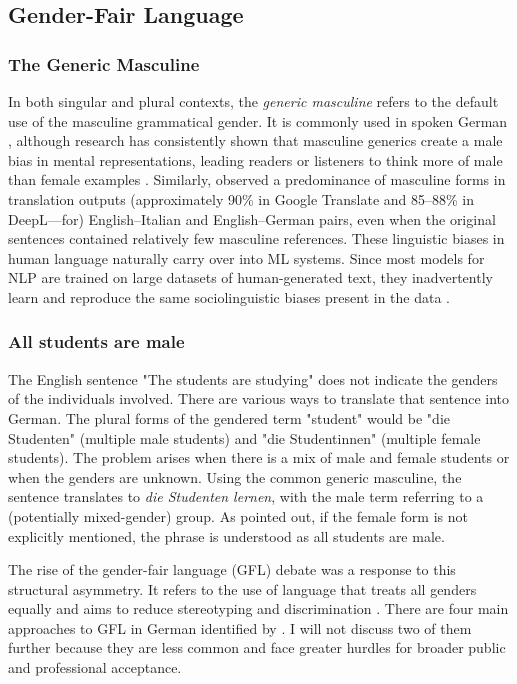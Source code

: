 \subsection{Gender-Fair Language}

\subsubsection{The Generic Masculine}  
In both singular and plural contexts, the \textit{generic masculine} refers to the default use of the masculine grammatical gender. It is commonly used in spoken German \citep{lardelliBuildingBridgesDataset2024,schmitzGermanAllProfessors2022}, although research has consistently shown that masculine generics create a male bias in mental representations, leading readers or listeners to think more of male than female examples \citep{sczesnyCanGenderFairLanguage2016}. Similarly, \citet{rescignoGenderBiasMachine2023} observed a predominance of masculine forms in translation outputs (approximately 90\% in Google Translate and 85–88\% in DeepL—for) English–Italian and English–German pairs, even when the original sentences contained relatively few masculine references. These linguistic biases in human language naturally carry over into ML systems. Since most models for NLP are trained on large datasets of human-generated text, they inadvertently learn and reproduce the same sociolinguistic biases present in the data \citep{choMeasuringGenderBias2019}.

\subsubsection{All students are male}
The English sentence "The students are studying" does not indicate the genders of the individuals involved. There are various ways to translate that sentence into German. The plural forms of the gendered term "student" would be "die Studenten" (multiple male students) and "die Studentinnen" (multiple female students). The problem arises when there is a mix of male and female students or when the genders are unknown. 
Using the common generic masculine, the sentence translates to \textit{die Studenten lernen}, with the male term referring to a (potentially mixed-gender) group. As \citet{schmitzGermanAllProfessors2022} pointed out, if the female form is not explicitly mentioned, the phrase is understood as all students are male.

The rise of the gender-fair language (GFL) debate was a response to this structural asymmetry. It refers to the use of language that treats all genders equally and aims to reduce stereotyping and discrimination \citep{sczesnyCanGenderFairLanguage2016}. 
There are four main approaches to GFL in German identified by \citet{lardelliBuildingBridgesDataset2024}. I will not discuss two of them further because they are less common and face greater hurdles for broader public and professional acceptance.

